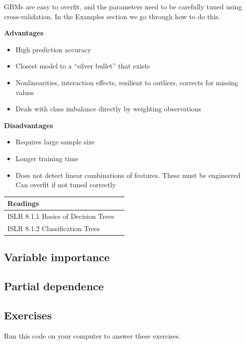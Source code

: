 \documentclass[]{book}
\providecommand{\tightlist}{%
  \setlength{\itemsep}{0pt}\setlength{\parskip}{0pt}}
\begin{document}
GBMs are easy to overfit, and the parameters need to be carefully tuned using cross-validation. In the Examples section we go through how to do this.

\textbf{Advantages}

\begin{itemize}
\tightlist
\item
  High prediction accuracy
\item
  Closest model to a ``silver bullet'' that exists
\item
  Nonlinearities, interaction effects, resilient to outliers, corrects for missing values
\item
  Deals with class imbalance directly by weighting observations
\end{itemize}

\textbf{Disadvantages}

\begin{itemize}
\tightlist
\item
  Requires large sample size
\item
  Longer training time
\item
  Does not detect linear combinations of features. These must be engineered
  Can overfit if not tuned correctly
\end{itemize}

\begin{longtable}[]{@{}ll@{}}
\toprule
Readings &\tabularnewline
\midrule
\endhead
ISLR 8.1.1 Basics of Decision Trees &\tabularnewline
ISLR 8.1.2 Classification Trees &\tabularnewline
\bottomrule
\end{longtable}

\hypertarget{variable-importance}{%
\subsection{Variable importance}\label{variable-importance}}

\hypertarget{partial-dependence}{%
\subsection{Partial dependence}\label{partial-dependence}}

\hypertarget{exercises-1}{%
\subsection{Exercises}\label{exercises-1}}

Run this code on your computer to answer these exercises.
\end{document}
